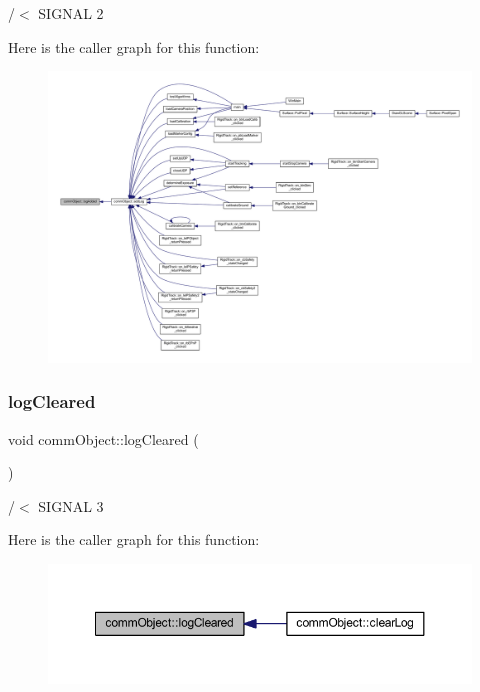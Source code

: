 /$<$ S\+I\+G\+N\+AL 2 

Here is the caller graph for this function\+:
\nopagebreak
\begin{figure}[H]
\begin{center}
\leavevmode
\includegraphics[width=350pt]{classcomm_object_a72620fe1bac16309baf6d148644edaf9_icgraph}
\end{center}
\end{figure}
\mbox{\label{classcomm_object_af2304085624c26230e9d930d616e3e19}} 
\subsubsection{\texorpdfstring{log\+Cleared}{logCleared}}
{\footnotesize\ttfamily void comm\+Object\+::log\+Cleared (\begin{DoxyParamCaption}{ }\end{DoxyParamCaption})\hspace{0.3cm}{\ttfamily [signal]}}



/$<$ S\+I\+G\+N\+AL 3 

Here is the caller graph for this function\+:
\nopagebreak
\begin{figure}[H]
\begin{center}
\leavevmode
\includegraphics[width=350pt]{classcomm_object_af2304085624c26230e9d930d616e3e19_icgraph}
\end{center}
\end{figure}
\mbox{\label{classcomm_object_af369de87a7f2c9b7170223bedd6c08d9}} 

